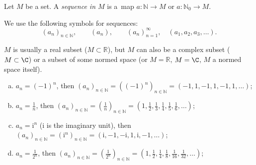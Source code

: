\begin{Definition}{}
 Let $M$ be a set. A \textit{sequence in $M$} is a~map $a:\mathbb{N}\to M$
 or $a:\mathbb{N}_0 \to M$.
\end{Definition}

We use the following symbols for sequences:
\[(a_n)_{n\in\mathbb{N}},\qquad (a_n),\qquad (a_n)_{n=1}^\infty,\quad (a_1,a_2,a_3,\ldots).\]
\begin{Remark}{}
 $M$ is usually a real subset ($M\subset\mathbb{R}$), but $M$ can also be a complex subset ($M\subset\C$) or a subset of some normed space 
 (or $M=\mathbb{R}$, $M=\C$, $M$ a normed space itself).
\end{Remark}

\begin{example}{}
 \begin{enumerate}[(a)]
  \item $a_n=(-1)^n$, then $(a_n)_{n\in\mathbb{N}}=((-1)^n)_{n\in\mathbb{N}}=(-1,1,-1,1,-1,1,\ldots)$;
  \whiteskipsmall
  \item $a_n=\frac1n$, then $(a_n)_{n\in\mathbb{N}}=(\frac1n)_{n\in\mathbb{N}}=(1,\frac12,\frac13,\frac14,\frac15,\frac16,\ldots)$;
    \whiteskipsmall
  \item $a_n=\mathrm{i}^n$ ($\mathrm{i}$ is the imaginary unit), then $(a_n)_{n\in\mathbb{N}}=(\mathrm{i}^n)_{n\in\mathbb{N}}=(\mathrm{i},-1,-\mathrm{i},1,\mathrm{i},-1,\ldots)$;
    \whiteskipsmall
  \item $a_n=\frac1{2^n}$, then $(a_n)_{n\in\mathbb{N}}=(\frac1{2^n})_{n\in\mathbb{N}}=(1,\frac12,\frac14,\frac18,\frac1{16},\frac1{32},\ldots)$;
    \whiteskipsmall
\end{enumerate}
\end{example}

